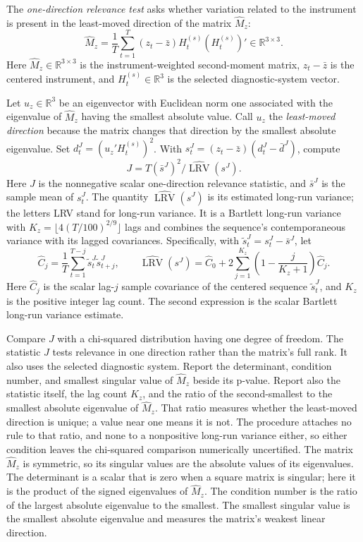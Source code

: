 \documentclass[11pt]{article}
\begin{document}
The \emph{one-direction relevance test} asks whether variation related to the instrument is present
in the least-moved direction of the matrix \(\widehat M_z\):
\begin{equation*}
 \widehat M_z=\frac1T\sum_{t=1}^{T}(z_t-\bar z)H_t^{(s)}(H_t^{(s)})'
 \in\mathbb R^{3\times3}.
\end{equation*}
Here \(\widehat M_z\in\mathbb R^{3\times3}\) is the instrument-weighted second-moment matrix,
\(z_t-\bar z\) is the centered instrument, and \(H_t^{(s)}\in\mathbb R^3\) is the selected
diagnostic-system vector.

Let \(u_z\in\mathbb R^3\) be an eigenvector with Euclidean norm one associated with the eigenvalue of
\(\widehat M_z\) having the smallest absolute value. Call \(u_z\) the \emph{least-moved direction}
because the matrix changes that direction by the smallest absolute eigenvalue. Set
\(d_t^J=(u_z'H_t^{(s)})^2\). With
\(s_t^J=(z_t-\bar z)(d_t^J-\bar d^J)\), compute
\begin{equation*}
 J=T(\bar s^J)^2/\widehat{\operatorname{LRV}}(s^J).
\end{equation*}
Here \(J\) is the nonnegative scalar one-direction relevance statistic, and \(\bar s^J\) is the
sample mean of \(s_t^J\). The quantity \(\widehat{\operatorname{LRV}}(s^J)\) is its estimated
long-run variance; the letters LRV stand for long-run variance.
It is a Bartlett long-run variance with \(K_z=\lfloor4(T/100)^{2/9}\rfloor\) lags and combines
the sequence's contemporaneous variance with its lagged covariances. Specifically, with
\(\widetilde s_t^J=s_t^J-\bar s^J\), let
\[
 \widehat C_j=\frac1T\sum_{t=1}^{T-j}\widetilde s_t^J\widetilde s_{t+j}^J,
 \qquad
 \widehat{\operatorname{LRV}}(s^J)=\widehat C_0+
 2\sum_{j=1}^{K_z}\left(1-\frac{j}{K_z+1}\right)\widehat C_j.
\]
Here \(\widehat C_j\) is the scalar lag-\(j\) sample covariance of the centered sequence
\(\widetilde s_t^J\), and \(K_z\) is the positive integer lag count. The second expression is the
scalar Bartlett long-run variance estimate.

Compare \(J\) with a chi-squared distribution having one
degree of freedom. The statistic \(J\) tests relevance in one direction rather than the matrix's full
rank. It also
uses the selected diagnostic system. Report the determinant, condition number, and smallest singular value of
\(\widehat M_z\) beside its p-value. Report also the statistic itself, the lag count \(K_z\), and the
ratio of the second-smallest to the smallest absolute eigenvalue of \(\widehat M_z\). That ratio
measures whether the least-moved direction is unique; a value near one means it is not. The procedure
attaches no rule to that ratio, and none to a nonpositive long-run variance either, so either
condition leaves the chi-squared comparison numerically uncertified.
The matrix \(\widehat M_z\) is symmetric, so its singular values are the absolute values of its
eigenvalues. The determinant is a scalar that is zero when a square matrix is singular; here it is
the product of the signed eigenvalues of \(\widehat M_z\). The condition number is the ratio of the
largest absolute eigenvalue to the smallest. The smallest singular value is the smallest absolute
eigenvalue and measures the matrix's weakest linear direction.
\end{document}
